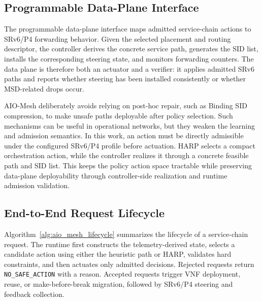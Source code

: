 \documentclass[final,5p]{elsarticle}
\begin{document}
\subsection{Programmable Data-Plane Interface}
\label{subsec:data_plane_interface}

The programmable data-plane interface maps admitted service-chain actions to SRv6/P4 forwarding behavior. Given the selected placement and routing descriptor, the controller derives the concrete service path, generates the SID list, installs the corresponding steering state, and monitors forwarding counters. The data plane is therefore both an actuator and a verifier: it applies admitted SRv6 paths and reports whether steering has been installed consistently or whether MSD-related drops occur.

AIO-Mesh deliberately avoids relying on post-hoc repair, such as Binding SID compression, to make unsafe paths deployable after policy selection. Such mechanisms can be useful in operational networks, but they weaken the learning and admission semantics. In this work, an action must be directly admissible under the configured SRv6/P4 profile before actuation. HARP selects a compact orchestration action, while the controller realizes it through a concrete feasible path and SID list. This keeps the policy action space tractable while preserving data-plane deployability through controller-side realization and runtime admission validation.

\subsection{End-to-End Request Lifecycle}
\label{subsec:request_lifecycle}

Algorithm~\ref{alg:aio_mesh_lifecycle} summarizes the lifecycle of a service-chain request. The runtime first constructs the telemetry-derived state, selects a candidate action using either the heuristic path or HARP, validates hard constraints, and then actuates only admitted decisions. Rejected requests return \texttt{NO\_SAFE\_ACTION} with a reason. Accepted requests trigger VNF deployment, reuse, or make-before-break migration, followed by SRv6/P4 steering and feedback collection.
\end{document}
